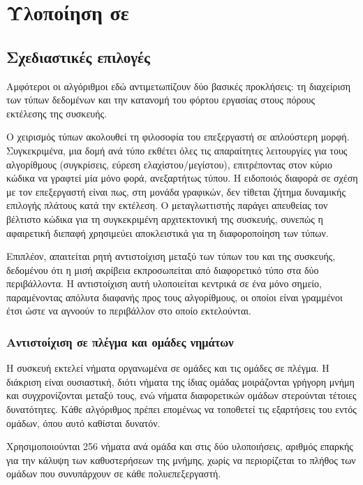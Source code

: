 \chapter{Υλοποίηση σε }
\label{ch:gpu}

\section{Σχεδιαστικές επιλογές}
\label{sec:gpu-design}

Αμφότεροι οι αλγόριθμοι εδώ αντιμετωπίζουν δύο βασικές προκλήσεις: τη
διαχείριση των τύπων δεδομένων και την κατανομή του φόρτου εργασίας στους
πόρους εκτέλεσης της συσκευής.

Ο χειρισμός τύπων ακολουθεί τη φιλοσοφία του επεξεργαστή σε απλούστερη μορφή.
Συγκεκριμένα, μια δομή ανά τύπο εκθέτει όλες τις απαραίτητες λειτουργίες για
τους αλγορίθμους (συγκρίσεις, εύρεση ελαχίστου/μεγίστου), επιτρέποντας στον
κύριο κώδικα να γραφτεί μία μόνο φορά, ανεξαρτήτως τύπου. Η ειδοποιός διαφορά
σε σχέση με τον επεξεργαστή είναι πως, στη μονάδα γραφικών, δεν τίθεται ζήτημα
δυναμικής επιλογής πλάτους κατά την εκτέλεση. Ο μεταγλωττιστής παράγει
απευθείας τον βέλτιστο κώδικα για τη συγκεκριμένη αρχιτεκτονική της συσκευής,
συνεπώς η αφαιρετική διεπαφή χρησιμεύει αποκλειστικά για τη διαφοροποίηση των
τύπων.

Επιπλέον, απαιτείται ρητή αντιστοίχιση μεταξύ των τύπων του  και της
συσκευής, δεδομένου ότι η μισή ακρίβεια εκπροσωπείται από διαφορετικό τύπο στα
δύο περιβάλλοντα. Η αντιστοίχιση αυτή υλοποιείται κεντρικά σε ένα μόνο σημείο,
παραμένοντας απόλυτα διαφανής προς τους αλγορίθμους, οι οποίοι είναι γραμμένοι
έτσι ώστε να αγνοούν το περιβάλλον στο οποίο εκτελούνται.

\subsection{Αντιστοίχιση σε πλέγμα και ομάδες νημάτων}
\label{sec:gpu-mapping}

Η συσκευή εκτελεί νήματα οργανωμένα σε ομάδες και τις ομάδες σε πλέγμα. Η
διάκριση είναι ουσιαστική, διότι νήματα της ίδιας ομάδας μοιράζονται γρήγορη
μνήμη και συγχρονίζονται μεταξύ τους, ενώ νήματα διαφορετικών ομάδων στερούνται
τέτοιες δυνατότητες. Κάθε αλγόριθμος πρέπει επομένως να τοποθετεί τις
εξαρτήσεις του εντός ομάδων, όπου αυτό καθίσται δυνατόν.

Χρησιμοποιούνται 256 νήματα ανά ομάδα και στις δύο υλοποιήσεις, αριθμός επαρκής
για την κάλυψη των καθυστερήσεων της μνήμης, χωρίς να περιορίζεται το πλήθος
των ομάδων που συνυπάρχουν σε κάθε πολυεπεξεργαστή.


